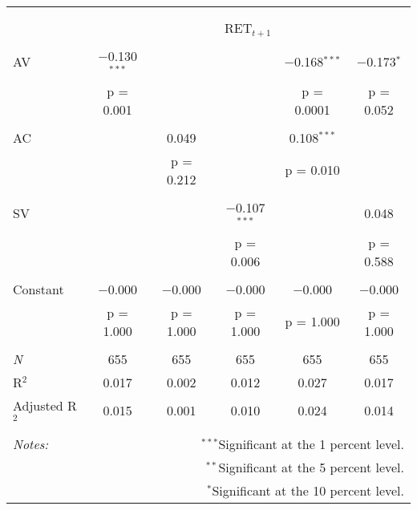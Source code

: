 
\begin{tabular}{@{\extracolsep{5pt}}lccccc} 
\\[-1.8ex]\hline 
\hline \\[-1.8ex] 
\\[-1.8ex] & \multicolumn{5}{c}{RET$_{t+1}$} \\ 
\hline \\[-1.8ex] 
 AV & $-$0.130$^{***}$ &  &  & $-$0.168$^{***}$ & $-$0.173$^{*}$ \\ 
  & p = 0.001 &  &  & p = 0.0001 & p = 0.052 \\ 
  & & & & & \\ 
 AC &  & 0.049 &  & 0.108$^{***}$ &  \\ 
  &  & p = 0.212 &  & p = 0.010 &  \\ 
  & & & & & \\ 
 SV &  &  & $-$0.107$^{***}$ &  & 0.048 \\ 
  &  &  & p = 0.006 &  & p = 0.588 \\ 
  & & & & & \\ 
 Constant & $-$0.000 & $-$0.000 & $-$0.000 & $-$0.000 & $-$0.000 \\ 
  & p = 1.000 & p = 1.000 & p = 1.000 & p = 1.000 & p = 1.000 \\ 
  & & & & & \\ 
\textit{N} & 655 & 655 & 655 & 655 & 655 \\ 
R$^{2}$ & 0.017 & 0.002 & 0.012 & 0.027 & 0.017 \\ 
Adjusted R$^{2}$ & 0.015 & 0.001 & 0.010 & 0.024 & 0.014 \\ 
\hline 
\hline \\[-1.8ex] 
\textit{Notes:} & \multicolumn{5}{r}{$^{***}$Significant at the 1 percent level.} \\ 
 & \multicolumn{5}{r}{$^{**}$Significant at the 5 percent level.} \\ 
 & \multicolumn{5}{r}{$^{*}$Significant at the 10 percent level.} \\ 
\end{tabular} 
